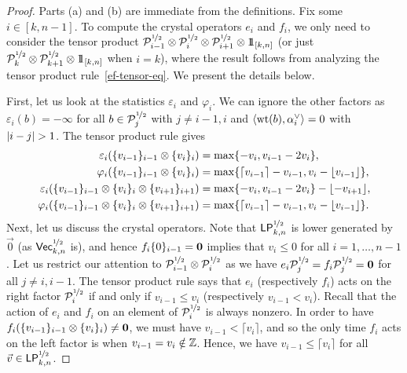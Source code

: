 \documentclass[11pt]{article}
\begin{document}
\begin{proof}
Parts (a) and (b) are immediate from the definitions.
Fix some $i \in [k,n-1]$.
To compute the crystal operators $e_i$ and $f_i$, we only need to consider the tensor product $\sqrtE_{i-1} \otimes \sqrtE_i \otimes \sqrtE_{i+1} \otimes \one_{[k,n]}$ (or just $\sqrtE_k \otimes \sqrtE_{k+1} \otimes \one_{[k,n]}$ when $i=k$), where the result follows from analyzing the tensor product rule~\eqref{ef-tensor-eq}.
We present the details below.

First, let us look at the statistics $\varepsilon_i$ and $\varphi_i$.
We can ignore the other factors as $\varepsilon_i(b) = -\infty$ for all $b \in \sqrtE_j$ with $j \neq i-1, i$ and $\langle \weight(b), \alpha_i^{\vee} \rangle = 0$ with $\abs{i - j} > 1$.
The tensor product rule gives
\begin{subequations}
\label{eq:ep_phi_pair}
\begin{align}
\varepsilon_i(\uj{i-1}{v_{i-1}} \otimes \uj{i}{v_i}) & = \max \{ -v_i, v_{i-1} - 2v_i \},  \label{eq:ep_2pair}
\allowdisplaybreaks \\
\varphi_i(\uj{i-1}{v_{i-1}} \otimes \uj{i}{v_i}) & = \max \{ \lceil v_{i-1} \rceil - v_{i-1}, v_i - \lfloor v_{i-1} \rfloor  \},
\allowdisplaybreaks \\
\varepsilon_i(\uj{i-1}{v_{i-1}} \otimes \uj{i}{v_i} \otimes \uj{i+1}{v_{i+1}}) & = \max \{ -v_i, v_{i-1} - 2v_i \} - \lfloor -v_{i+1} \rfloor ,
\allowdisplaybreaks \\
\varphi_i(\uj{i-1}{v_{i-1}} \otimes \uj{i}{v_i} \otimes \uj{i+1}{v_{i+1}}) & = \max \{ \lceil v_{i-1} \rceil - v_{i-1}, v_i - \lfloor v_{i-1} \rfloor  \}.
\end{align}
\end{subequations}
Next, let us discuss the crystal operators.
Note that $\PCrysR{k}$ is lower generated by $\vec{0}$ (as $\VCrysR{k}$ is), and hence $f_i \uj{i-1}{0} = \zero$ implies that $v_i \leq 0$ for all $i = 1, \dotsc, n-1$.
Let us restrict our attention to $\sqrtE_{i-1} \otimes \sqrtE_i$ as we have $e_i \sqrtE_j = f_i \sqrtE_j = \zero$ for all $j \neq i, i-1$.
The tensor product rule says that $e_i$ (respectively $f_i$) acts on the right factor $\sqrtE_i$ if and only if $v_{i-1} \leq v_i$ (respectively $v_{i-1} < v_i$).
Recall that the action of $e_i$ and $f_i$ on an element of $\sqrtE_i$ is always nonzero.
In order to have $f_i (\uj{i-1}{v_{i-1}} \otimes \uj{i}{v_i}) \neq \zero$, we must have $v_{i-1} < \lceil v_i \rceil$, and so the only time $f_i$ acts on the left factor is when $v_{i-1} = v_i \notin \ZZ$.
Hence, we have $v_{i-1} \leq \lceil v_i \rceil$ for all $\vec{v} \in \PCrysR{k}$.


\end{proof}
\end{document}
